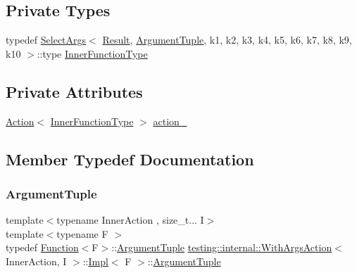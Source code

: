 \subsection*{Private Types}
\begin{DoxyCompactItemize}
\item 
typedef \mbox{\hyperlink{classtesting_1_1internal_1_1_select_args}{Select\+Args}}$<$ \mbox{\hyperlink{classtesting_1_1_action_interface_a7477de2fe3e4e01c59db698203acaee7}{Result}}, \mbox{\hyperlink{classtesting_1_1_action_interface_af72720d864da4d606629e83edc003511}{Argument\+Tuple}}, k1, k2, k3, k4, k5, k6, k7, k8, k9, k10 $>$\+::type \mbox{\hyperlink{classtesting_1_1internal_1_1_with_args_action_1_1_impl_ae7e21dae071e88eb5889c9d14e0b5212}{Inner\+Function\+Type}}
\end{DoxyCompactItemize}
\subsection*{Private Attributes}
\begin{DoxyCompactItemize}
\item 
\mbox{\hyperlink{classtesting_1_1_action}{Action}}$<$ \mbox{\hyperlink{classtesting_1_1internal_1_1_with_args_action_1_1_impl_ae7e21dae071e88eb5889c9d14e0b5212}{Inner\+Function\+Type}} $>$ \mbox{\hyperlink{classtesting_1_1internal_1_1_with_args_action_1_1_impl_a221640d183f6d2b0968720b310a2d661}{action\+\_\+}}
\end{DoxyCompactItemize}


\subsection{Member Typedef Documentation}
\mbox{\label{classtesting_1_1internal_1_1_with_args_action_1_1_impl_adf88b511330a7bbc0f8cb2e916893b5c}} 
\subsubsection{\texorpdfstring{ArgumentTuple}{ArgumentTuple}}
{\footnotesize\ttfamily template$<$typename Inner\+Action , size\+\_\+t... I$>$ \\
template$<$typename F $>$ \\
typedef \mbox{\hyperlink{structtesting_1_1internal_1_1_function}{Function}}$<$F$>$\+::\mbox{\hyperlink{classtesting_1_1_action_interface_af72720d864da4d606629e83edc003511}{Argument\+Tuple}} \mbox{\hyperlink{structtesting_1_1internal_1_1_with_args_action}{testing\+::internal\+::\+With\+Args\+Action}}$<$ Inner\+Action, I $>$\+::\mbox{\hyperlink{classtesting_1_1internal_1_1_with_args_action_1_1_impl}{Impl}}$<$ F $>$\+::\mbox{\hyperlink{classtesting_1_1_action_interface_af72720d864da4d606629e83edc003511}{Argument\+Tuple}}}

